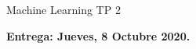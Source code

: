 \def\due{Jueves, 8 Octubre 2020}
\def\zipscript{\texttt{zip -j ps4\_submission.zip src/mnist/nn.py src/spam/spam.py}}
\def\zipscriptalt{\texttt{python zip\_submission.py}}
\def\psetnum{4 }

\ifdefined{} \else \def\solutions{2} \fi





Machine Learning TP 2

{\bf Entrega: {\due }.}



\begin{enumerate}[wide, labelwidth=!, labelindent=0pt]



\end{enumerate}


